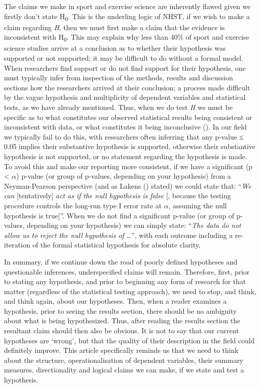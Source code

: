 \documentclass[
]{article}
\begin{document}
The claims we make in sport and exercise science are inherently flawed
given we firstly don't state H\textsubscript{0}. This is the underling
logic of NHST, if we wish to make a claim regarding \emph{H}, then we
must first make a claim that the evidence is inconsistent with
H\textsubscript{0}. This may explain why less than 40\% of sport and
exercise science studies arrive at a conclusion as to whether their
hypothesis was supported or not supported; it may be difficult to do
without a formal model. When researchers find support or do not find
support for their hypothesis, one must typically infer from inspection
of the methods, results and discussion sections how the researchers
arrived at their conclusion; a process made difficult by the vague
hypothesis and multiplicity of dependent variables and statistical
tests, as we have already mentioned. Thus, when we do test \emph{H} we
must be specific as to what constitutes our observed statistical results
being consistent or inconsistent with data, or what constitutes it being
inconclusive (). In our field we typically fail to do this, with researchers
often inferring that any p-value ≤ 0.05 implies their substantive
hypothesis is supported, otherwise their substantive hypothesis is not
supported, or no statement regarding the hypothesis is made. To avoid
this and make our reporting more consistent, if we have a significant (p
\textless{} \(\alpha\)) p-value (or group of p-values, depending on your
hypothesis) from a Neyman-Pearson perspective (and as Lakens
() stated) we could
state that: ``\emph{We can} {[}tentatively{]} \emph{act as if the null
hypothesis is false} {[}, because the testing procedure controls the
long-run type I error rate at \(\alpha\), assuming the null hypothesis
is true{]}''. When we do not find a significant p-value (or group of
p-values, depending on your hypothesis) we can simply state: ``\emph{The
data do not allow us to reject the null hypothesis of \ldots{}}'', with
each outcome including a re-iteration of the formal statistical
hypothesis for absolute clarity.

In summary, if we continue down the road of poorly defined hypotheses
and questionable inferences, underspecified claims will remain.
Therefore, first, prior to stating any hypothesis, and prior to
beginning any form of research for that matter (regardless of the
statistical testing approach), we need to stop, and think, and think
again, about our hypotheses. Then, when a reader examines a hypothesis,
prior to seeing the results section, there should be no ambiguity about
what is being hypothesized. Thus, after reading the results section the
resultant claim should then also be obvious. It is not to say that our
current hypotheses are `wrong', but that the quality of their
description in the field could definitely improve. This article
specifically reminds us that we need to think about the structure,
operationalisation of dependent variables, their summary measures,
directionality and logical claims we can make, if we state and test a
hypothesis.
\end{document}
